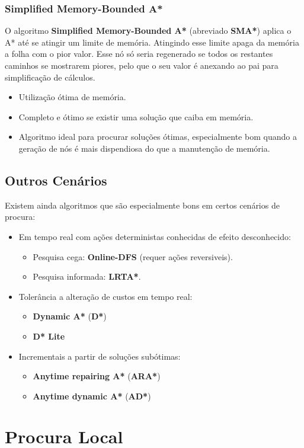 \documentclass[]{report}
\begin{document}
\subsection{Simplified Memory-Bounded A*}
O algoritmo \textbf{Simplified Memory-Bounded A*} (abreviado \textbf{SMA*}) aplica o A* até se atingir um limite de memória. Atingindo esse limite apaga da memória a folha com o pior valor. Esse nó só seria regenerado se todos os restantes caminhos se mostrarem piores, pelo que o seu valor é anexando ao pai para simplificação de cálculos.
\begin{itemize}
	\item Utilização ótima de memória.
	\item Completo e ótimo se existir uma solução que caiba em memória.
	\item Algoritmo ideal para procurar soluções ótimas, especialmente bom quando a geração de nós é mais dispendiosa do que a manutenção de memória.
\end{itemize}
\section{Outros Cenários}
Existem ainda algoritmos que são especialmente bons em certos cenários de procura:
\begin{itemize}
	\item Em tempo real com ações deterministas conhecidas de efeito desconhecido:
	\begin{itemize}
		\item Pesquisa cega: \textbf{Online-DFS} (requer ações reversiveis).
		\item Pesquisa informada: \textbf{LRTA*}.
	\end{itemize}
	\item Tolerância a alteração de custos em tempo real:
	\begin{itemize}
	\item \textbf{Dynamic A*} (\textbf{D*})
	\item \textbf{D* Lite}
	\end{itemize}
	\item Incrementais a partir de soluções subótimas:
	\begin{itemize}
	\item \textbf{Anytime repairing A*} (\textbf{ARA*})
	\item \textbf{Anytime dynamic A*} (\textbf{AD*})
	\end{itemize}
\end{itemize}
\chapter{Procura Local}
\end{document}
